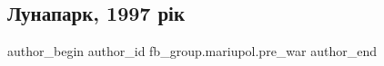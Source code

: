  
 
 
 
 

\subsection{Лунапарк, 1997 рік}
\label{sec:16_02_2023.fb.fb_group.mariupol.pre_war.1.lunapark__1997_r_k}

\ifcmt
 author_begin
   author_id fb_group.mariupol.pre_war
 author_end
\fi
